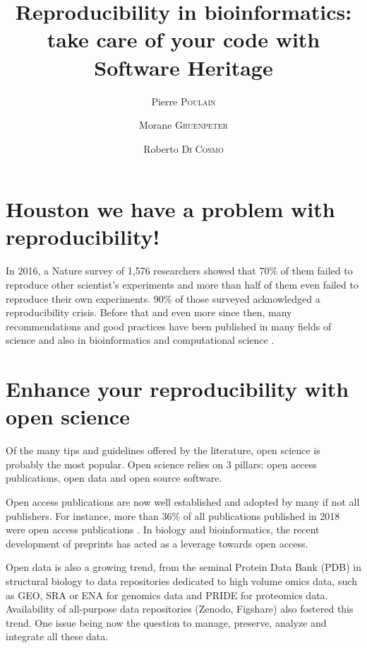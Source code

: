 \documentclass[long, final]{jobim}
\title{Reproducibility in bioinformatics: take care of your code with Software Heritage}
\author{Pierre \textsc{Poulain}\inst{1} \and Morane \textsc{Gruenpeter}\inst{2} \and Roberto \textsc{Di Cosmo}\inst{3}}
\institute{
 Université de Paris, CNRS, Institut Jacques Monod, F-75006, Paris, France
 \and
 Software Heritage, Inria, France
 \and
 Software Heritage, Inria and University of Paris, France
}
\begin{document}

   \maketitle

 \section{Houston we have a problem with reproducibility!}
 \label{sec:introduction}

In 2016, a Nature survey of 1,576 researchers \cite{baker2016b} showed that 70\% of them failed to reproduce other scientist’s experiments and more than half of them even failed to reproduce their own experiments. 90\% of those surveyed acknowledged a reproducibility crisis. Before that \cite{donoho2010,peng2011,markowetz2015} and even more since then, many recommendations and good practices have been published in many fields of science and also in bioinformatics and computational science \cite{barba2016,gruning2018,kim2018,barba2019}. 

\section{Enhance your reproducibility with open science}
\label{sec:enhance}

Of the many tips and guidelines offered by the literature, open science is probably the most popular. Open science relies on 3 pillars: open access publications, open data and open source software.

Open access publications are now well established and adopted by many if not all publishers. For instance, more than 36\% of all publications published in 2018 were open access publications \cite{trendsopenaccesspublications}. In biology and bioinformatics, the recent development of preprints has acted as a leverage towards open access.

Open data is also a growing trend, from the seminal Protein Data Bank (PDB) in structural biology to data repositories dedicated to high volume omics data, such as GEO, SRA or ENA for genomics data and PRIDE for proteomics data. Availability of all-purpose data repositories (Zenodo, Figshare) also fostered this trend. One issue being now the question to manage, preserve, analyze and integrate all these data.
\end{document}
